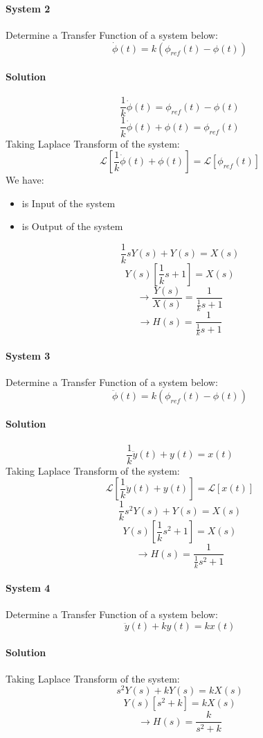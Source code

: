 \paragraph{System 2} Determine a Transfer Function of a system below:
\[\dot{\phi}(t) = k(\phi_{ref}(t) - \phi(t))\]
\paragraph{Solution}
\[\frac{1}{k}\dot{\phi}(t) = \phi_{ref}(t) - \phi(t)\]
\[\frac{1}{k}\dot{\phi}(t) + \phi(t) = \phi_{ref}(t)\]
Taking Laplace Transform of the system:
\[\mathcal{L}[\frac{1}{k}\dot{\phi}(t) + \phi(t)] = \mathcal{L}[\phi_{ref}(t)]\]
We have:
\begin{itemize}
	\item { is Input of the system}
	\item { is Output of the system}
\end{itemize}
\[\frac{1}{k}sY(s) + Y(s) = X(s)\]
\[Y(s)[\frac{1}{k}s +1] = X(s)\]
\[\rightarrow \frac{Y(s)}{X(s)} = \frac{1}{\frac{1}{k}s + 1}\]
\[\rightarrow \boxed{H(s) = \frac{1}{\frac{1}{k}s + 1}}\]



\paragraph{System 3} Determine a Transfer Function of a system below:
\[\ddot{\phi}(t) = k(\phi_{ref}(t) - \phi(t))\]
\paragraph{Solution}
\[\frac{1}{k}\ddot{y}(t) + y(t) = x(t)\]
Taking Laplace Transform of the system:
\[\mathcal{L}[\frac{1}{k}\ddot{y}(t) + y(t)] = \mathcal{L}[x(t)]\]
\[\frac{1}{k}s^2Y(s) + Y(s) = X(s)\]
\[Y(s)[\frac{1}{k}s^2 + 1] = X(s)\]
\[\rightarrow \boxed{H(s) = \frac{1}{\frac{1}{k}s^2 + 1}}\]


\paragraph{System 4} Determine a Transfer Function of a system below:
\[\ddot{y}(t) + ky(t)= kx(t)\]
\paragraph{Solution}
Taking Laplace Transform of the system:
\[s^2Y(s) + kY(s) = kX(s)\]
\[Y(s)[s^2 + k] = kX(s)\]
\[\rightarrow \boxed{H(s) = \frac{k}{s^2 + k}}\]


